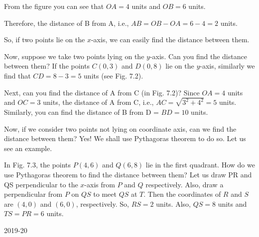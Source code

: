 \documentclass[12pt]{article}
\begin{document}
From the figure you can see that $OA = 4$ units and $OB = 6$ units.

Therefore, the distance of B from A, i.e., $AB = OB - OA = 6 - 4 = 2$ units.

So, if two points lie on the $x$-axis, we can easily find the distance between them.

Now, suppose we take two points lying on the $y$-axis. Can you find the distance between them? If the points $C(0, 3)$ and $D(0, 8)$ lie on the $y$-axis, similarly we find that $CD = 8 - 3 = 5$ units (see Fig. 7.2).

Next, can you find the distance of A from C (in Fig. 7.2)? Since $OA = 4$ units and $OC = 3$ units, the distance of A from C, i.e., $AC = \sqrt{3^2 + 4^2} = 5$ units. Similarly, you can find the distance of B from D = $BD = 10$ units.

Now, if we consider two points not lying on coordinate axis, can we find the distance between them? Yes! We shall use Pythagoras theorem to do so. Let us see an example.

In Fig. 7.3, the points $P(4, 6)$ and $Q(6, 8)$ lie in the first quadrant. How do we use Pythagoras theorem to find the distance between them? Let us draw PR and QS perpendicular to the $x$-axis from $P$ and $Q$ respectively. Also, draw a perpendicular from $P$ on $QS$ to meet $QS$ at $T$. Then the coordinates of $R$ and $S$ are $(4, 0)$ and $(6, 0)$, respectively. So, $RS = 2$ units. Also, $QS = 8$ units and $TS = PR = 6$ units.

\vfill
\begin{flushright}
\small 2019-20
\end{flushright}
\end{document}
